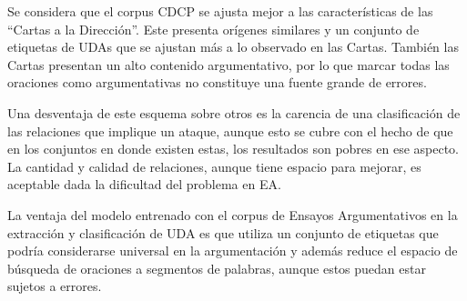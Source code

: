 \documentclass[a4paper,11pt,twocolumn,twoside]{article}
\begin{document}
\begin{table}[h]
	\begin{center}
		\caption{\label{table:comparative_test_abstrct_f1_metrics_segmenter}Métricas comparativas del corpus AbsTRCT.}
	\end{center}
\end{table}


Se considera que el corpus CDCP se ajusta mejor a las características de las ``Cartas 
a la Dirección''. Este presenta orígenes similares y un conjunto de etiquetas de UDAs que se ajustan más a lo observado 
en las Cartas. También las Cartas presentan un alto contenido argumentativo, por lo que marcar 
todas las oraciones como argumentativas no constituye una fuente grande de errores.

Una desventaja de este esquema sobre otros es la carencia de una 
clasificación de las relaciones que implique un ataque, aunque esto se cubre con el hecho de 
que en los conjuntos en donde existen estas, los resultados son pobres en ese aspecto. La cantidad 
y calidad de relaciones, aunque tiene espacio para mejorar, es aceptable dada la dificultad 
del problema en EA.

La ventaja del modelo entrenado con el corpus de Ensayos Argumentativos en la extracción 
y clasificación de UDA es que utiliza un conjunto de etiquetas que 
podría considerarse universal en la argumentación y además reduce el espacio de búsqueda de 
oraciones a segmentos de palabras, aunque estos puedan estar sujetos a errores. 
\end{document}
